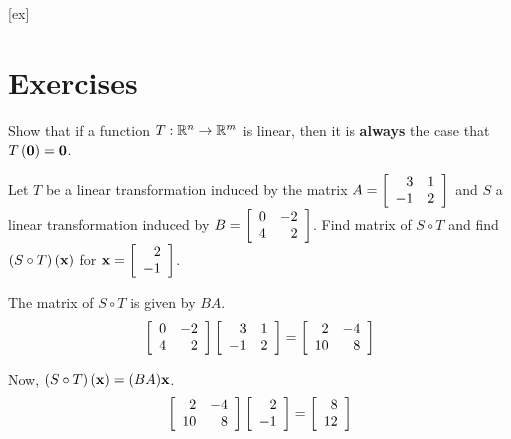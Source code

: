 [ex]
\section*{Exercises}

\begin{enumialphparenastyle}

\begin{ex} Show that if a function $T:\mathbb{R}^{n}\rightarrow \mathbb{R}^{m}$
is linear, then it is \textbf{always }the case that $T\left({\bf 0}\right) = {\bf 0}$.
\end{ex}

\begin{ex} Let $T$ be a linear transformation induced by the matrix $A = \left[ \begin{array}{rr}
3 & 1 \\
-1 & 2
\end{array}\right]$ and $S$ a linear transformation induced by $B = \left[ \begin{array}{rr}
0 & -2 \\
4 & 2 
\end{array}\right]$. Find matrix of $S \circ T$ and find $\left( S \circ T \right) \left( {\bf x} \right)$ for ${\bf x} = \left[ \begin{array}{r}
2 \\
-1 
\end{array} \right]$. 
\begin{sol}
The matrix of $S \circ T$ is given by $BA$. 
\[
\left[ \begin{array}{rr}
0 & -2 \\
4 & 2 
\end{array}\right] \left[ \begin{array}{rr}
3 & 1 \\
-1 & 2
\end{array}\right] = \left[ 
\begin{array}{rr}
2 & -4 \\
10 & 8 
\end{array}
\right]
\]

Now, $\left( S \circ T \right) \left( {\bf x} \right) = (BA) {\bf x}$. 
\[
 \left[ 
\begin{array}{rr}
2 & -4 \\
10 & 8 
\end{array}
\right]
\left[ \begin{array}{r}
2 \\
-1 
\end{array} \right]
= 
\left[
\begin{array}{r}
8 \\
12
\end{array}
\right]
\]


\end{sol}
\end{ex}
\end{enumialphparenastyle}
